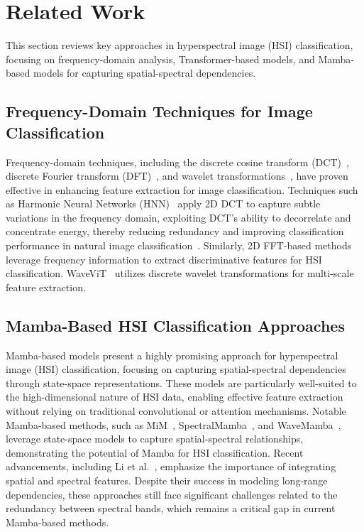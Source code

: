 \section{Related Work}
\label{sec:related_work}

This section reviews key approaches in hyperspectral image (HSI) classification, focusing on frequency-domain analysis, Transformer-based models, and Mamba-based models for capturing spatial-spectral dependencies.

\subsection{Frequency-Domain Techniques for Image Classification}

Frequency-domain techniques, including the discrete cosine transform (DCT)~\cite{shen2021dct, ulicny2022harmonic, xu2020learning, ulicny2019harmonic}, discrete Fourier transform (DFT)~\cite{zhang2024three, wang2019frequency}, and wavelet transformations~\cite{yao2022wave}, have proven effective in enhancing feature extraction for image classification. Techniques such as Harmonic Neural Networks (HNN)~\cite{ulicny2022harmonic, ulicny2019harmonic} apply 2D DCT to capture subtle variations in the frequency domain, exploiting DCT’s ability to decorrelate and concentrate energy, thereby reducing redundancy and improving classification performance in natural image classification~\cite{ahmed1974discrete}. Similarly, 2D FFT-based methods~\cite{qiao2023dual, zhang2024three, wang2019frequency} leverage frequency information to extract discriminative features for HSI classification. WaveViT~\cite{yao2022wave} utilizes discrete wavelet transformations for multi-scale feature extraction.

\subsection{Mamba-Based HSI Classification Approaches}

Mamba-based models present a highly promising approach for hyperspectral image (HSI) classification, focusing on capturing spatial-spectral dependencies through state-space representations. These models are particularly well-suited to the high-dimensional nature of HSI data, enabling effective feature extraction without relying on traditional convolutional or attention mechanisms. Notable Mamba-based methods, such as MiM~\cite{zhou2024mamba}, SpectralMamba~\cite{yao2024spectralmamba}, and WaveMamba~\cite{ahmad2024wavemamba}, leverage state-space models to capture spatial-spectral relationships, demonstrating the potential of Mamba for HSI classification. Recent advancements, including Li et al.~\cite{li2024mambahsi}, emphasize the importance of integrating spatial and spectral features. Despite their success in modeling long-range dependencies, these approaches still face significant challenges related to the redundancy between spectral bands, which remains a critical gap in current Mamba-based methods.
